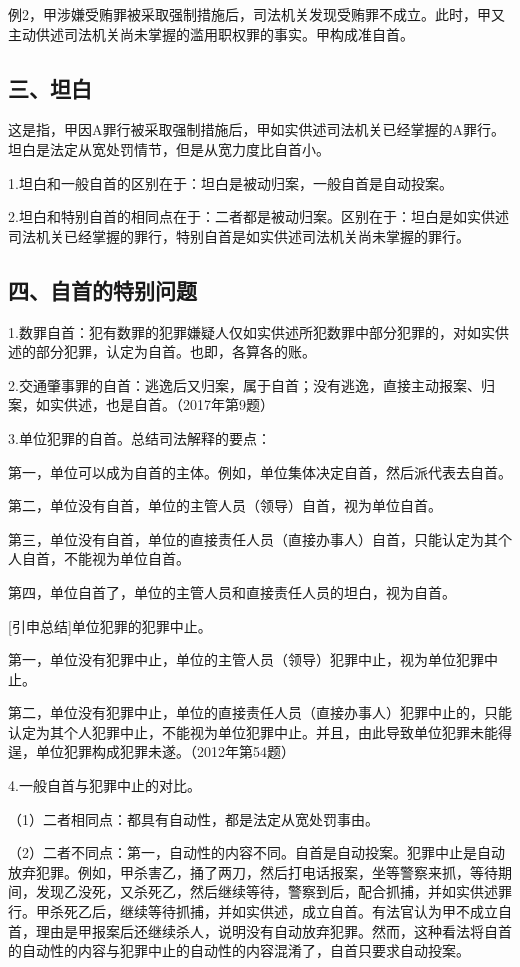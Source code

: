 例2，甲涉嫌受贿罪被采取强制措施后，司法机关发现受贿罪不成立。此时，甲又主动供述司法机关尚未掌握的滥用职权罪的事实。甲构成准自首。

\subsection*{三、坦白}

这是指，甲因A罪行被采取强制措施后，甲如实供述司法机关已经掌握的A罪行。坦白是法定从宽处罚情节，但是从宽力度比自首小。

1.坦白和一般自首的区别在于：坦白是被动归案，一般自首是自动投案。

2.坦白和特别自首的相同点在于：二者都是被动归案。区别在于：坦白是如实供述司法机关已经掌握的罪行，特别自首是如实供述司法机关尚未掌握的罪行。

\subsection*{四、自首的特别问题}

1.数罪自首：犯有数罪的犯罪嫌疑人仅如实供述所犯数罪中部分犯罪的，对如实供述的部分犯罪，认定为自首。也即，各算各的账。

2.交通肇事罪的自首：逃逸后又归案，属于自首；没有逃逸，直接主动报案、归案，如实供述，也是自首。（2017年第9题）

3.单位犯罪的自首。总结司法解释的要点：

第一，单位可以成为自首的主体。例如，单位集体决定自首，然后派代表去自首。

第二，单位没有自首，单位的主管人员（领导）自首，视为单位自首。

第三，单位没有自首，单位的直接责任人员（直接办事人）自首，只能认定为其个人自首，不能视为单位自首。

第四，单位自首了，单位的主管人员和直接责任人员的坦白，视为自首。

[引申总结]单位犯罪的犯罪中止。

第一，单位没有犯罪中止，单位的主管人员（领导）犯罪中止，视为单位犯罪中止。

第二，单位没有犯罪中止，单位的直接责任人员（直接办事人）犯罪中止的，只能认定为其个人犯罪中止，不能视为单位犯罪中止。并且，由此导致单位犯罪未能得逞，单位犯罪构成犯罪未遂。（2012年第54题）

4.一般自首与犯罪中止的对比。

（1）二者相同点：都具有自动性，都是法定从宽处罚事由。

（2）二者不同点：第一，自动性的内容不同。自首是自动投案。犯罪中止是自动放弃犯罪。例如，甲杀害乙，捅了两刀，然后打电话报案，坐等警察来抓，等待期间，发现乙没死，又杀死乙，然后继续等待，警察到后，配合抓捕，并如实供述罪行。甲杀死乙后，继续等待抓捕，并如实供述，成立自首。有法官认为甲不成立自首，理由是甲报案后还继续杀人，说明没有自动放弃犯罪。然而，这种看法将自首的自动性的内容与犯罪中止的自动性的内容混淆了，自首只要求自动投案。

